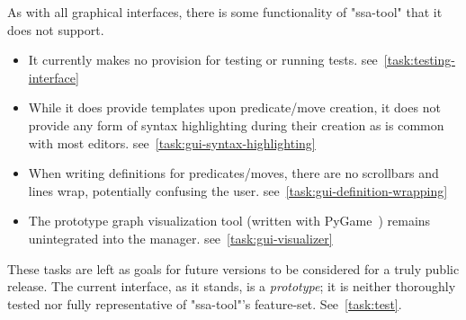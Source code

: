 As with all graphical interfaces,
  there is some functionality of "ssa-tool" that it does not support.
\begin{itemize}
\providecommand\TaskRef[1]{\hfill\mbox{see~\autoref{task:#1}}}
\item It currently makes no provision for testing or running tests.
  \TaskRef{testing-interface}
\item While it does provide templates upon predicate\slash move creation,
  it does not provide any form of syntax highlighting during their creation
  as is common with most editors.
  \TaskRef{gui-syntax-highlighting}
\item When writing definitions for predicates\slash moves,
  there are no scrollbars and lines wrap, potentially confusing the user.
  \TaskRef{gui-definition-wrapping}
\item The prototype graph visualization tool
  (written with PyGame~\autocite{pygame})
  remains unintegrated into the manager.
  \TaskRef{gui-visualizer}
\end{itemize}
These tasks are left as goals for future versions to be considered for a truly public release.
The current interface, as it stands, is a \emph{prototype}; it is neither thoroughly tested
  nor fully representative of "ssa-tool"'s feature-set.
See~\autoref{task:test}.

